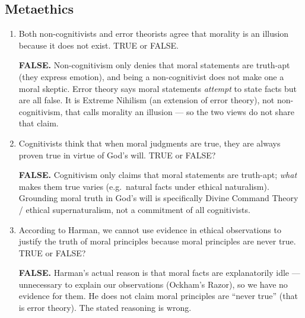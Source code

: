 \documentclass[12pt]{article}
\begin{document}
\subsection{Metaethics}
\begin{enumerate}
    \item Both non-cognitivists and error theorists agree that morality is an illusion because it does not exist. TRUE or FALSE.
    \begin{answer}\textbf{FALSE.} Non-cognitivism only denies that moral statements are truth-apt (they express emotion), and being a non-cognitivist does not make one a moral skeptic. Error theory says moral statements \emph{attempt} to state facts but are all false. It is Extreme Nihilism (an extension of error theory), not non-cognitivism, that calls morality an illusion --- so the two views do not share that claim.\end{answer}
    \item Cognitivists think that when moral judgments are true, they are always proven true in virtue of God’s will. TRUE or FALSE?
    \begin{answer}\textbf{FALSE.} Cognitivism only claims that moral statements are truth-apt; \emph{what} makes them true varies (e.g.\ natural facts under ethical naturalism). Grounding moral truth in God’s will is specifically Divine Command Theory / ethical supernaturalism, not a commitment of all cognitivists.\end{answer}
    \item According to Harman, we cannot use evidence in ethical observations to justify the truth of moral principles because moral principles are never true. TRUE or FALSE?
    \begin{answer}\textbf{FALSE.} Harman’s actual reason is that moral facts are explanatorily idle --- unnecessary to explain our observations (Ockham’s Razor), so we have no evidence for them. He does not claim moral principles are ``never true'' (that is error theory). The stated reasoning is wrong.\end{answer}
\end{enumerate}
\end{document}
